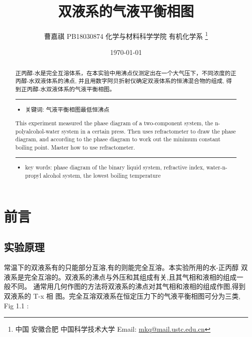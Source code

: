 \documentclass[11pt]{report}
\author{曹嘉祺 PB18030874 化学与材料科学学院 有机化学系 \thanks{中国 安徽合肥 中国科学技术大学 Email: \href{mailto:mkq@mail.ustc.edu.cn}{mkq@mail.ustc.edu.cn}}}
\date{\today}
\title{双液系的气液平衡相图}
\begin{document}
\maketitle
\tableofcontents

\begin{abstract}
正丙醇-水是完全互溶体系，在本实验中用沸点仪测定出在一个大气压下，不同浓度的正丙醇-水双液体系的沸点, 并且用数字阿贝折射仪确定双液体系的恒沸混合物的组成,
得到正丙醇-水双液体系的气液平衡相图。


\noindent\rule{\textwidth}{0.5pt}
\begin{itemize}
\item 关键词: 气液平衡\quad 相图\quad 最低恒沸点
\end{itemize}
\end{abstract}
\begin{abstract}
 This experiment measured the phase diagram of a two-component system, the
n-polyalcohol-water system in a certain press. Then uses refractometer to draw the phase diagram,
and according to the phase diagram to work out the minimum constant boiling point. Master how
to use refractometer.


\noindent\rule{\textwidth}{0.5pt}

\begin{itemize}
\item key words: phase diagram of the binary liquid system, refractive index,  water-n-propyl alcohol system, the lowest boiling temperature
\end{itemize}
\end{abstract}
\part{前言}
\label{sec:orgb9eaa66}
\chapter{实验原理}
\label{sec:orgd413a35}
常温下的双液系有的只能部分互溶,有的则能完全互溶。本实验所用的水-正丙醇
双液系是完全互溶的。双液系的沸点与外压和其组成有关,且其气相和液相的组成一般不同。
通常用几何作图的方法将双液系的沸点对其气相和液相的组成作图,得到双液系的 T-x 相
图。完全互溶双液系在恒定压力下的气液平衡相图可分为三类, Fig 1.1 :
\end{document}
